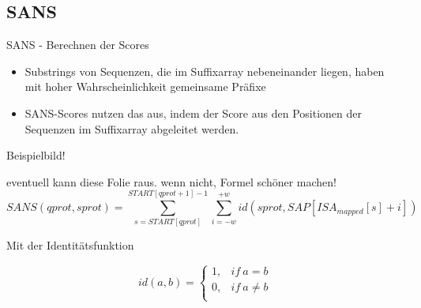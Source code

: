 \documentclass[aspectratio=1610]{beamer}
\begin{document}
\subsection{SANS}

\begin{frame}{SANS - Berechnen der Scores}
  \begin{itemize}
    \item Substrings von Sequenzen, die im Suffixarray nebeneinander liegen, haben mit hoher Wahrscheinlichkeit gemeinsame Präfixe
    \item  SANS-Scores nutzen das aus, indem der Score aus den Positionen der Sequenzen im Suffixarray abgeleitet werden.
  \end{itemize}
  
  Beispielbild!
\end{frame}

\begin{frame}

eventuell kann diese Folie raus. wenn nicht, Formel schöner machen!
  \begin{equation*}
    SANS(qprot,sprot) = \sum_{s=START[qprot]}^{START[qprot+1]-1} \sum_{i=-w}^{+w} id(sprot,SAP[ISA_{mapped}[s]+i]) 
  \end{equation*}

  Mit der Identitätsfunktion

  \begin{equation*}
    id(a,b)=\begin{cases}
      1, & if~a=b\\
      0, & if~a\ne b\\
    \end{cases}
  \end{equation*}
\end{frame}
\end{document}
